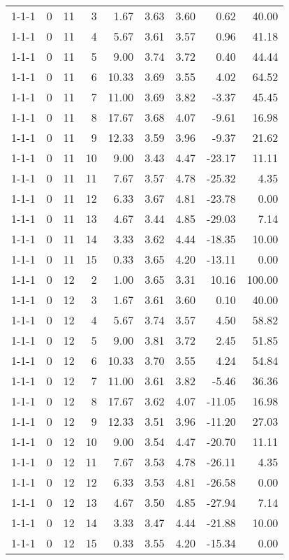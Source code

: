 \begin{tabular}{lrrrrrrrr}
1-1-1 & 0 & 11 & 3 & 1.67 & 3.63 & 3.60 & 0.62 & 40.00 \\
1-1-1 & 0 & 11 & 4 & 5.67 & 3.61 & 3.57 & 0.96 & 41.18 \\
1-1-1 & 0 & 11 & 5 & 9.00 & 3.74 & 3.72 & 0.40 & 44.44 \\
1-1-1 & 0 & 11 & 6 & 10.33 & 3.69 & 3.55 & 4.02 & 64.52 \\
1-1-1 & 0 & 11 & 7 & 11.00 & 3.69 & 3.82 & -3.37 & 45.45 \\
1-1-1 & 0 & 11 & 8 & 17.67 & 3.68 & 4.07 & -9.61 & 16.98 \\
1-1-1 & 0 & 11 & 9 & 12.33 & 3.59 & 3.96 & -9.37 & 21.62 \\
1-1-1 & 0 & 11 & 10 & 9.00 & 3.43 & 4.47 & -23.17 & 11.11 \\
1-1-1 & 0 & 11 & 11 & 7.67 & 3.57 & 4.78 & -25.32 & 4.35 \\
1-1-1 & 0 & 11 & 12 & 6.33 & 3.67 & 4.81 & -23.78 & 0.00 \\
1-1-1 & 0 & 11 & 13 & 4.67 & 3.44 & 4.85 & -29.03 & 7.14 \\
1-1-1 & 0 & 11 & 14 & 3.33 & 3.62 & 4.44 & -18.35 & 10.00 \\
1-1-1 & 0 & 11 & 15 & 0.33 & 3.65 & 4.20 & -13.11 & 0.00 \\
1-1-1 & 0 & 12 & 2 & 1.00 & 3.65 & 3.31 & 10.16 & 100.00 \\
1-1-1 & 0 & 12 & 3 & 1.67 & 3.61 & 3.60 & 0.10 & 40.00 \\
1-1-1 & 0 & 12 & 4 & 5.67 & 3.74 & 3.57 & 4.50 & 58.82 \\
1-1-1 & 0 & 12 & 5 & 9.00 & 3.81 & 3.72 & 2.45 & 51.85 \\
1-1-1 & 0 & 12 & 6 & 10.33 & 3.70 & 3.55 & 4.24 & 54.84 \\
1-1-1 & 0 & 12 & 7 & 11.00 & 3.61 & 3.82 & -5.46 & 36.36 \\
1-1-1 & 0 & 12 & 8 & 17.67 & 3.62 & 4.07 & -11.05 & 16.98 \\
1-1-1 & 0 & 12 & 9 & 12.33 & 3.51 & 3.96 & -11.20 & 27.03 \\
1-1-1 & 0 & 12 & 10 & 9.00 & 3.54 & 4.47 & -20.70 & 11.11 \\
1-1-1 & 0 & 12 & 11 & 7.67 & 3.53 & 4.78 & -26.11 & 4.35 \\
1-1-1 & 0 & 12 & 12 & 6.33 & 3.53 & 4.81 & -26.58 & 0.00 \\
1-1-1 & 0 & 12 & 13 & 4.67 & 3.50 & 4.85 & -27.94 & 7.14 \\
1-1-1 & 0 & 12 & 14 & 3.33 & 3.47 & 4.44 & -21.88 & 10.00 \\
1-1-1 & 0 & 12 & 15 & 0.33 & 3.55 & 4.20 & -15.34 & 0.00 \\

\end{tabular}
